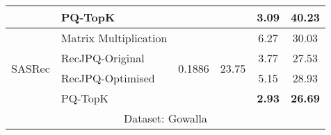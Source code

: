 \begin{tabular}{llcccc}
\multicolumn{1}{l|}{}                                                         & \multicolumn{1}{l|}{PQ-TopK}                                                             &                                                    &                                                             & \textbf{3.09}                                           & \textbf{40.23}                                        \\ \hline
\multicolumn{1}{l|}{\multirow{4}{*}{SASRec}}                                  & \multicolumn{1}{l|}{Matrix Multiplication}                                               & \multirow{4}{*}{0.1886}                            & \multirow{4}{*}{23.75}                                      & 6.27                                                    & 30.03                                                 \\
\multicolumn{1}{l|}{}                                                         & \multicolumn{1}{l|}{RecJPQ-Original}                                                     &                                                    &                                                             & 3.77                                                    & 27.53                                                 \\
\multicolumn{1}{l|}{}                                                         & \multicolumn{1}{l|}{RecJPQ-Optimised}                                                    &                                                    &                                                             & 5.15                                                    & 28.93                                                 \\
\multicolumn{1}{l|}{}                                                         & \multicolumn{1}{l|}{PQ-TopK}                                                             &                                                    &                                                             & \textbf{2.93}                                           & \textbf{26.69}                                        \\ \hline
\multicolumn{6}{c}{Dataset: Gowalla}                                                                                                                                                                                                                                                                                                                                                                          \\ \hline

\end{tabular}

